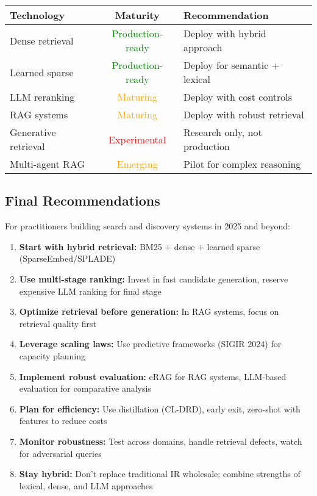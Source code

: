 \documentclass[11pt,letterpaper]{article}
\begin{document}
\begin{center}
\begin{tabular}{|l|c|l|}
\hline
\textbf{Technology} & \textbf{Maturity} & \textbf{Recommendation} \\
\hline
Dense retrieval & \textcolor{green}{Production-ready} & Deploy with hybrid approach \\
\hline
Learned sparse & \textcolor{green}{Production-ready} & Deploy for semantic + lexical \\
\hline
LLM reranking & \textcolor{orange}{Maturing} & Deploy with cost controls \\
\hline
RAG systems & \textcolor{orange}{Maturing} & Deploy with robust retrieval \\
\hline
Generative retrieval & \textcolor{red}{Experimental} & Research only, not production \\
\hline
Multi-agent RAG & \textcolor{orange}{Emerging} & Pilot for complex reasoning \\
\hline
\end{tabular}
\end{center}

\subsection{Final Recommendations}

For practitioners building search and discovery systems in 2025 and beyond:

\begin{enumerate}[leftmargin=*]
    \item \textbf{Start with hybrid retrieval:} BM25 + dense + learned sparse (SparseEmbed/SPLADE)

    \item \textbf{Use multi-stage ranking:} Invest in fast candidate generation, reserve expensive LLM ranking for final stage

    \item \textbf{Optimize retrieval before generation:} In RAG systems, focus on retrieval quality first

    \item \textbf{Leverage scaling laws:} Use predictive frameworks (SIGIR 2024) for capacity planning

    \item \textbf{Implement robust evaluation:} eRAG for RAG systems, LLM-based evaluation for comparative analysis

    \item \textbf{Plan for efficiency:} Use distillation (CL-DRD), early exit, zero-shot with features to reduce costs

    \item \textbf{Monitor robustness:} Test across domains, handle retrieval defects, watch for adversarial queries

    \item \textbf{Stay hybrid:} Don't replace traditional IR wholesale; combine strengths of lexical, dense, and LLM approaches
\end{enumerate}
\end{document}
